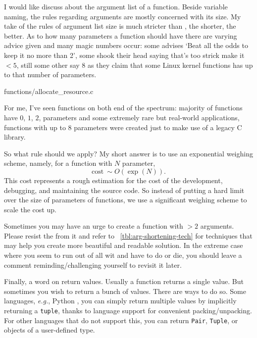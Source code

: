 \documentclass[oneside,11pt]{book}
\theoremstyle{definition}
\theoremstyle{remark}
\newcommand{\code}[1]{\mbox{\lstinline{#1}}}
\newcommand{\python}{Python }
\begin{document}
I would like discuss about the argument list of a function.
Beside variable naming,
the rules regarding arguments are mostly concerned with its size.
My take of the rules of argument list size is much stricter than , the shorter, the better.
As to how many parameters a function should have there are varying advice given and many magic
numbers occur: some advises `Beat all the odds to keep it no more than 2', some shook their head
saying that's too strick make it $<5$, still some other say $8$ as they claim that some Linux
kernel functions has up to that number of parameters.

\begin{clisting}
    
    {functions/allocate_resource.c}
\end{clisting}

For me, I've seen functions on both end of the spectrum: majority of functions have $0$, $1$, $2$,
parameters and some extremely rare but real-world applications, functions with up to $8$
parameters were created just to make use of a legacy C library.

So what rule should we apply?
My short answer is to use an exponential weighing scheme, namely, for a function
with $N$ parameter,
\begin{equation}
    \mbox{cost}~\sim O(\exp(N)).
\end{equation}
This cost represents a rough estimation for the cost of the development, debugging, and maintaining
the source code.
So instead of putting a hard limit over the size of parameters of functions, we use a significant
weighing scheme to scale the cost up.

Sometimes you may have an urge to create a function with $>2$ arguments.
Please resist the from it and refer to ~\autoref{tbl:arg-shortening-tech} for techniques that may
help you create more beautiful and readable solution.
In the extreme case where you seem to run out of all wit and have to do or die,
you should leave a comment reminding/challenging yourself to revisit it later.


Finally, a word on return values.
Usually a function returns a single value.
But sometimes you wish to return a bunch of values.
There are ways to do so.
Some languages, \textit{e.g.}, \python, you can simply return multiple values by implicitly
returning a \code{tuple}, thanks to language support for convenient packing/unpacking.
For other languages that do not support this, you can return \code{Pair}, \code{Tuple}, or
objects of a user-defined type.
\end{document}
